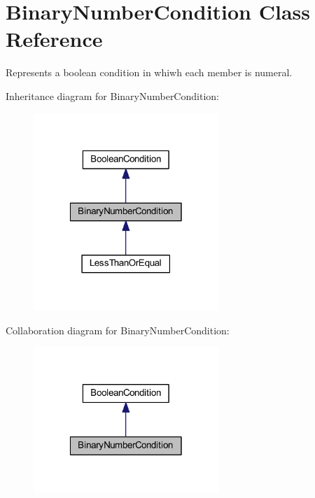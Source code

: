 \hypertarget{class_binary_number_condition}{\section{Binary\-Number\-Condition Class Reference}
\label{class_binary_number_condition}
}


Represents a boolean condition in whiwh each member is numeral.  




Inheritance diagram for Binary\-Number\-Condition\-:\nopagebreak
\begin{figure}[H]
\begin{center}
\leavevmode
\includegraphics[width=198pt]{class_binary_number_condition__inherit__graph}
\end{center}
\end{figure}


Collaboration diagram for Binary\-Number\-Condition\-:\nopagebreak
\begin{figure}[H]
\begin{center}
\leavevmode
\includegraphics[width=198pt]{class_binary_number_condition__coll__graph}
\end{center}
\end{figure}
